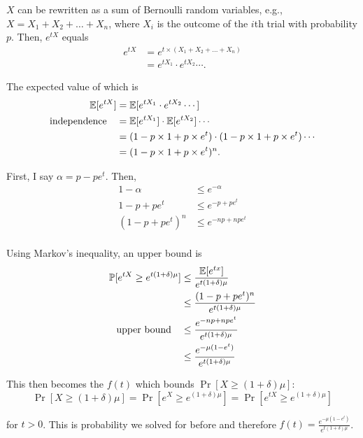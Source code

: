 \documentclass[11pt]{article}
\begin{document}
\begin{solution}
    
\begin{Parts}
    
\Part $X$ can be rewritten as a sum of Bernoulli random variables, e.g., $X = 
X_1 + X_2 + \dots + X_n$, where $X_i$ is the outcome of the $i$th trial with 
probability $p$. Then, $e^{tX}$ equals
\[
    \begin{split}
        e^{tX} &= e^{t \times (X_1 + X_2 + \dots + X_n)} \\
        &= e^{tX_1} \cdot e^{tX_2} \cdots.
    \end{split}
\]

The expected value of which is 
\[
    \begin{split}
        \operatorname{\mathbb{E}}[e^{tX}] &= \operatorname{\mathbb{E}}[e^{tX_1} \cdot e^{tX_2} \cdots ] \\
        \text{independence} \quad &= \operatorname{\mathbb{E}}[e^{tX_1}] \cdot \operatorname{\mathbb{E}}[e^{tX_2}] \cdots  \\
        &= (1-p \times 1 + p \times e^t) \cdot (1-p \times 1 + p \times e^t) \cdots \\
        &= (1-p \times 1 + p \times e^t)^n.
    \end{split}
\]

\Part First, I say $\alpha = p-pe^t$. Then,
\[
    \begin{split}
        1-\alpha &\leq e^{-\alpha} \\
        1-p+pe^t &\leq e^{-p+pe^t} \\
        (1-p+pe^t)^n &\leq e^{-np+npe^t} \\
    \end{split}
\]

\Part Using Markov's inequality, an upper bound is
\[
    \begin{split}
        \operatorname{\mathbb{P}}[e^{tX} \ge e^{t(1 + \delta) \mu}] &\leq \frac{\operatorname{\mathbb{E}}[e^{tx}]}{e^{t(1+ \delta) \mu}} \\
        &\leq \frac{(1-p+pe^t)^n}{e^{t(1+\delta) \mu}} \\
        \text{upper bound} \quad &\leq \frac{e^{-np+npe^t}}{e^{t(1+\delta) \mu}} \\
        &\leq \frac{e^{-\mu(1-e^t)}}{e^{t(1+\delta) \mu}}
    \end{split}
\]

This then becomes the $f(t)$ which bounds $\Pr[X \geq (1+\delta)\mu]$:
\[
    \Pr[X \geq (1+\delta)\mu] = \Pr[e^X \geq e^{(1+\delta)\mu}]
    = \Pr[e^{tX} \geq e^{(1+\delta)\mu}]
\]

for $t > 0$. This is probability we solved for before and therefore $f(t) = 
\frac{e^{-\mu(1-e^t)}}{e^{t(1+\delta) \mu}}$.


\end{Parts}
\end{solution}
\end{document}
